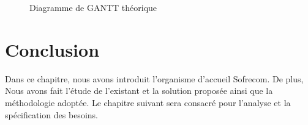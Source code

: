           \begin{figure}[htpb]
 \centering
{}
\caption{Diagramme de GANTT théorique}
\label{fig:Diagrammegantt }
\end{figure}

\newpage

\section*{Conclusion}
   Dans ce chapitre, nous avons introduit l’organisme d’accueil Sofrecom. De plus, Nous avons fait l’étude de l’existant et la solution proposée ainsi que la méthodologie adoptée. Le chapitre suivant sera consacré pour l’analyse et la spécification des besoins.
    